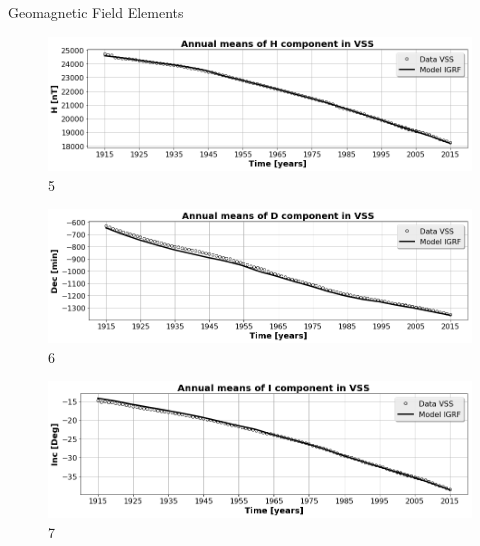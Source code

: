 \documentclass[final,t]{beamer}
\begin{document}
\begin{columns}[t]
\begin{column}{.66\linewidth}
\begin{columns}
\begin{column}{.31\linewidth}
\begin{block}{Geomagnetic Field Elements}
\begin{figure}
	\centering
	\includegraphics[width=0.8\linewidth, height=0.1\textheight]{"figs_ed/H mean all_v2"}
	\caption{5}
	\label{fig:Hmeanall_v2}
\end{figure}


\begin{figure}
\centering
\includegraphics[width=0.9\linewidth, height=0.1\textheight]{"figs_ed/D mean all_v2"}
\caption{6}
\label{fig:Dmeanall_v2}
\end{figure}


\begin{figure}
\centering
\includegraphics[width=0.9\linewidth, height=0.1\textheight]{"figs_ed/I mean all_v2"}
\caption{7}
\label{fig:Imeanall_v2}
\end{figure}


	
	
\end{block}




\end{column}
\end{columns}
\end{column}
\end{columns}
\end{document}
